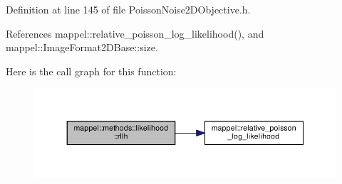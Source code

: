 Definition at line 145 of file Poisson\+Noise2\+D\+Objective.\+h.



References mappel\+::relative\+\_\+poisson\+\_\+log\+\_\+likelihood(), and mappel\+::\+Image\+Format2\+D\+Base\+::size.



Here is the call graph for this function\+:\nopagebreak
\begin{figure}[H]
\begin{center}
\leavevmode
\includegraphics[width=350pt]{namespacemappel_1_1methods_1_1likelihood_aa8cbdb607db58f763a8dc70ef48372f1_cgraph}
\end{center}
\end{figure}


